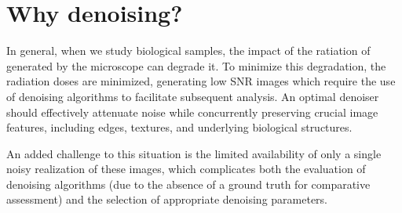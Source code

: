 
\section{Why denoising?}
\label{sec:why_denoising}


In general, when we study biological samples, the impact of the
ratiation of generated by the microscope can degrade it. To minimize
this degradation, the radiation doses are minimized, generating low
\gls{SNR} images which require the use of denoising algorithms to
facilitate subsequent analysis. An optimal denoiser should
effectively attenuate noise while concurrently preserving crucial
image features, including edges, textures, and underlying biological
structures.

An added challenge to this situation is the limited availability of
only a single noisy realization of these images, which complicates
both the evaluation of denoising algorithms (due to the absence of a
ground truth for comparative assessment) and the selection of
appropriate denoising parameters. 


